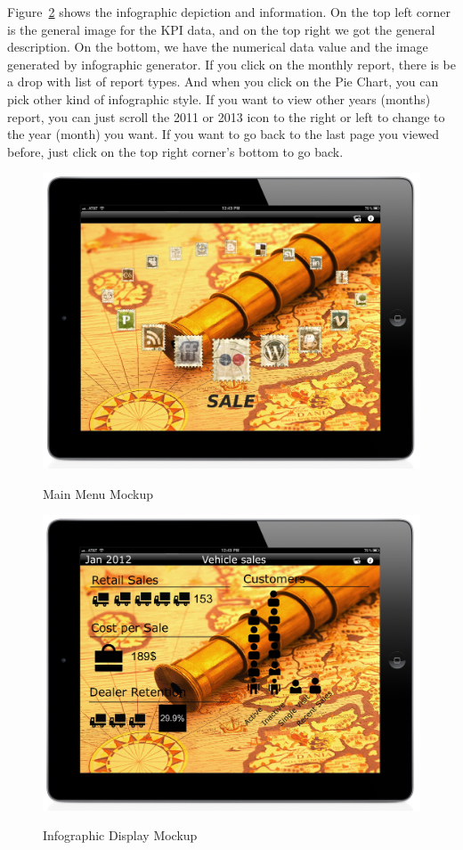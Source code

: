 \documentclass[11pt,a4paper,oneside]{article}
\begin{document}
Figure~\ref{mockup-infographic-display-1} shows the infographic depiction and information.  On the top left corner is the general image for the KPI data, and on the top right we got the general description.  On the bottom, we have the numerical data value and the image generated by infographic generator.  If you click on the monthly report, there is be a drop with list of report types.  And when you click on the Pie Chart, you can pick other kind of infographic style.  If you want to view other years (months) report, you can just scroll the 2011 or 2013 icon to the right or left to change to the year (month) you want.  If you want to go back to the last page you viewed before, just click on the top right corner’s bottom to go back.\\


\begin{figure}[!]
\caption{Main Menu Mockup\label{mockup-main-menu}}
\includegraphics[width=1\textwidth]{images/screen.jpg}\\
\end{figure}


\begin{figure}[!]
\caption{Infographic Display Mockup\label{mockup-infographic-display-1}}
\includegraphics[width=1\textwidth]{images/screen5.jpg}\\
\end{figure}
\end{document}
